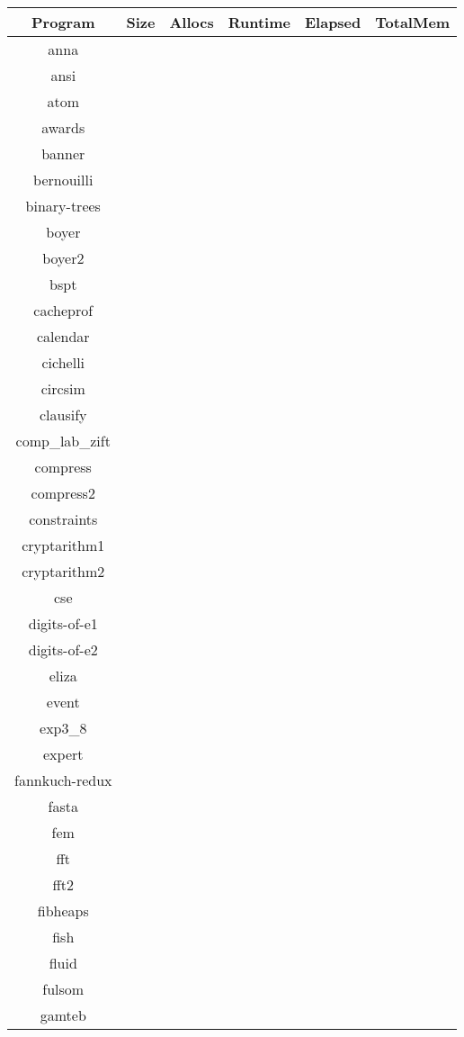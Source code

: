 \begin{tabular}{ c c c c c c }
Program & Size & Allocs & Runtime & Elapsed & TotalMem\\
\hline
anna &  &  &  &  & \\
ansi &  &  &  &  & \\
atom &  &  &  &  & \\
awards &  &  &  &  & \\
banner &  &  &  &  & \\
bernouilli &  &  &  &  & \\
binary-trees &  &  &  &  & \\
boyer &  &  &  &  & \\
boyer2 &  &  &  &  & \\
bspt &  &  &  &  & \\
cacheprof &  &  &  &  & \\
calendar &  &  &  &  & \\
cichelli &  &  &  &  & \\
circsim &  &  &  &  & \\
clausify &  &  &  &  & \\
comp\_lab\_zift &  &  &  &  & \\
compress &  &  &  &  & \\
compress2 &  &  &  &  & \\
constraints &  &  &  &  & \\
cryptarithm1 &  &  &  &  & \\
cryptarithm2 &  &  &  &  & \\
cse &  &  &  &  & \\
digits-of-e1 &  &  &  &  & \\
digits-of-e2 &  &  &  &  & \\
eliza &  &  &  &  & \\
event &  &  &  &  & \\
exp3\_8 &  &  &  &  & \\
expert &  &  &  &  & \\
fannkuch-redux &  &  &  &  & \\
fasta &  &  &  &  & \\
fem &  &  &  &  & \\
fft &  &  &  &  & \\
fft2 &  &  &  &  & \\
fibheaps &  &  &  &  & \\
fish &  &  &  &  & \\
fluid &  &  &  &  & \\
fulsom &  &  &  &  & \\
gamteb &  &  &  &  & \\

\end{tabular}
